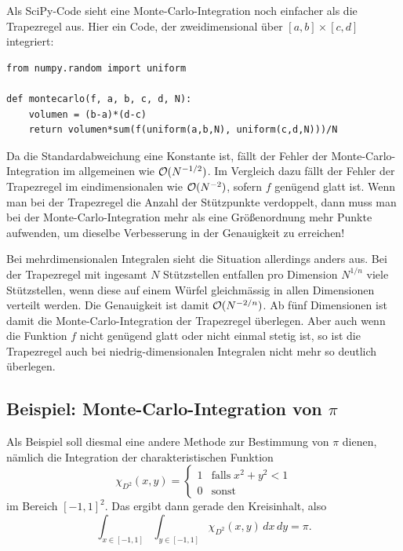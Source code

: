 Als SciPy-Code sieht eine Monte-Carlo-Integration noch einfacher als
die Trapezregel aus. Hier ein Code, der zweidimensional über
$[a,b]\times[c,d]$ integriert:
\begin{lstlisting}
from numpy.random import uniform

def montecarlo(f, a, b, c, d, N):
    volumen = (b-a)*(d-c)
    return volumen*sum(f(uniform(a,b,N), uniform(c,d,N)))/N
\end{lstlisting}

Da die Standardabweichung eine Konstante ist, fällt der Fehler der
Monte-Carlo-Integration im allgemeinen wie $\mathcal O(N^{-1/2})$. Im
Vergleich dazu fällt der Fehler der Trapezregel im eindimensionalen
wie $\mathcal O(N^{-2})$, sofern $f$ genügend glatt ist. Wenn man bei der
Trapezregel die Anzahl der Stützpunkte verdoppelt, dann muss man bei
der Monte-Carlo-Integration mehr als eine Größenordnung mehr Punkte
aufwenden, um dieselbe Verbesserung in der Genauigkeit zu erreichen!

Bei mehrdimensionalen Integralen sieht die Situation allerdings anders
aus. Bei der Trapezregel mit ingesamt $N$ Stützstellen entfallen pro
Dimension $N^{1/n}$ viele Stützstellen, wenn diese auf einem Würfel
gleichmässig in allen Dimensionen verteilt werden. Die Genauigkeit ist
damit $\mathcal O(N^{-2/n})$. Ab fünf Dimensionen ist damit die
Monte-Carlo-Integration der Trapezregel überlegen. Aber auch wenn die
Funktion $f$ nicht genügend glatt oder nicht einmal stetig ist, so ist
die Trapezregel auch bei niedrig-dimensionalen Integralen nicht mehr
so deutlich überlegen.

\subsection{Beispiel: Monte-Carlo-Integration von $\pi$}

Als Beispiel soll diesmal eine andere Methode zur Bestimmung von
$\pi$ dienen, nämlich die Integration der charakteristischen Funktion
\begin{equation}
  \chi_{D^2}(x, y)=
  \begin{cases}
    1 & \text{falls}\; x^2 + y^2 < 1\\
    0 & \text{sonst}
  \end{cases}
\end{equation}
im Bereich $[-1,1]^2$. Das ergibt dann gerade den Kreisinhalt, also
\begin{equation}
  \int_{x\in[-1,1]}\int_{y\in[-1,1]}\chi_{D^2}(x, y)\,dx\,dy
  = \pi.
\end{equation}


